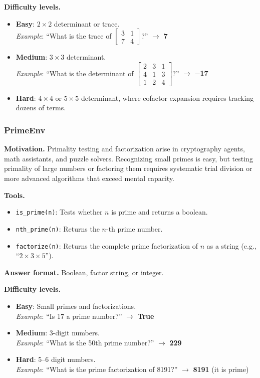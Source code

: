 \textbf{Difficulty levels.}
\begin{itemize}
    \item \textbf{Easy}: $2\times2$ determinant or trace.\\
    \emph{Example}: ``What is the trace of $\begin{bmatrix}3&1\\7&4\end{bmatrix}$?'' $\to$ \textbf{7}
    \item \textbf{Medium}: $3\times3$ determinant.\\
    \emph{Example}: ``What is the determinant of $\begin{bmatrix}2&3&1\\4&1&3\\1&2&4\end{bmatrix}$?'' $\to$ \textbf{$-$17}
    \item \textbf{Hard}: $4\times4$ or $5\times5$ determinant, where cofactor expansion requires tracking dozens of terms.
\end{itemize}

\subsubsection{PrimeEnv}

\textbf{Motivation.}
Primality testing and factorization arise in cryptography agents, math assistants, and puzzle solvers. Recognizing small primes is easy, but testing primality of large numbers or factoring them requires systematic trial division or more advanced algorithms that exceed mental capacity.

\textbf{Tools.}
\begin{itemize}
    \item \texttt{is\_prime(n)}: Tests whether $n$ is prime and returns a boolean.
    \item \texttt{nth\_prime(n)}: Returns the $n$-th prime number.
    \item \texttt{factorize(n)}: Returns the complete prime factorization of $n$ as a string (e.g., ``$2 \times 3 \times 5$'').
\end{itemize}

\textbf{Answer format.} Boolean, factor string, or integer.

\textbf{Difficulty levels.}
\begin{itemize}
    \item \textbf{Easy}: Small primes and factorizations.\\
    \emph{Example}: ``Is 17 a prime number?'' $\to$ \textbf{True}
    \item \textbf{Medium}: 3-digit numbers.\\
    \emph{Example}: ``What is the 50th prime number?'' $\to$ \textbf{229}
    \item \textbf{Hard}: 5--6 digit numbers.\\
    \emph{Example}: ``What is the prime factorization of 8191?'' $\to$ \textbf{8191} (it is prime)
\end{itemize}

